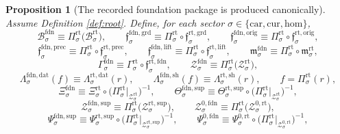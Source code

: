 \documentclass[11pt]{article}
\newcommand{\Car}{\mathrm{car}}
\newcommand{\Cur}{\mathrm{cur}}
\newcommand{\Hom}{\mathrm{hom}}
\newcommand{\FoundBody}[1]{\mathcal B_{#1}^{\mathrm{fdn}}}
\newcommand{\FoundGroundMin}[1]{\mathfrak f_{#1}^{\mathrm{fdn,grd}}}
\newcommand{\FoundOrigMin}[1]{\mathfrak f_{#1}^{\mathrm{fdn,orig}}}
\newcommand{\FoundPrecMin}[1]{\mathfrak f_{#1}^{\mathrm{fdn,prec}}}
\newcommand{\FoundLiftMin}[1]{\mathfrak f_{#1}^{\mathrm{fdn,lift}}}
\newcommand{\FoundSubMin}[1]{\mathfrak m_{#1}^{\mathrm{fdn}}}
\newcommand{\FoundSection}[1]{\Gamma_{#1}^{\mathrm{fdn}}}
\newcommand{\FoundData}[1]{\Lambda_{#1}^{\mathrm{fdn,dat}}}
\newcommand{\FoundShellMap}[1]{\Lambda_{#1}^{\mathrm{fdn,sh}}}
\newcommand{\FoundShellSet}[1]{\mathcal Z_{#1}^{\mathrm{fdn}}}
\newcommand{\FoundChart}[1]{\Xi_{#1}^{\mathrm{fdn}}}
\newcommand{\FoundSupport}[1]{\Theta_{#1}^{\mathrm{fdn,sup}}}
\newcommand{\FoundSupportShell}[1]{\mathcal Z_{#1}^{\mathrm{fdn,sup}}}
\newcommand{\FoundZeroCore}[1]{\mathcal Z_{#1}^{0,\mathrm{fdn}}}
\newcommand{\FoundEqChart}[1]{\Psi_{#1}^{\mathrm{fdn,sup}}}
\newcommand{\FoundZeroChart}[1]{\Psi_{#1}^{0,\mathrm{fdn}}}
\newcommand{\RootBody}[1]{\mathcal B_{#1}^{\mathrm{rt}}}
\newcommand{\RootProj}[1]{\Pi_{#1}^{\mathrm{rt}}}
\newcommand{\RootFoundMin}[1]{\mathfrak f_{#1}^{\mathrm{rt,fdn}}}
\newcommand{\RootGroundMin}[1]{\mathfrak f_{#1}^{\mathrm{rt,grd}}}
\newcommand{\RootOrigMin}[1]{\mathfrak f_{#1}^{\mathrm{rt,orig}}}
\newcommand{\RootPrecMin}[1]{\mathfrak f_{#1}^{\mathrm{rt,prec}}}
\newcommand{\RootLiftMin}[1]{\mathfrak f_{#1}^{\mathrm{rt,lift}}}
\newcommand{\RootSubMin}[1]{\mathfrak m_{#1}^{\mathrm{rt}}}
\newcommand{\RootSection}[1]{\Gamma_{#1}^{\mathrm{rt}}}
\newcommand{\RootData}[1]{\Lambda_{#1}^{\mathrm{rt,dat}}}
\newcommand{\RootShellMap}[1]{\Lambda_{#1}^{\mathrm{rt,sh}}}
\newcommand{\RootShellSet}[1]{\mathcal Z_{#1}^{\mathrm{rt}}}
\newcommand{\RootChart}[1]{\Xi_{#1}^{\mathrm{rt}}}
\newcommand{\RootSupport}[1]{\Theta_{#1}^{\mathrm{rt,sup}}}
\newcommand{\RootSupportShell}[1]{\mathcal Z_{#1}^{\mathrm{rt,sup}}}
\newcommand{\RootZeroCore}[1]{\mathcal Z_{#1}^{0,\mathrm{rt}}}
\newcommand{\RootEqChart}[1]{\Psi_{#1}^{\mathrm{rt,sup}}}
\newcommand{\RootZeroChart}[1]{\Psi_{#1}^{0,\mathrm{rt}}}
\newtheorem{proposition}{Proposition}
\begin{document}
\begin{proposition}[The recorded foundation package is produced canonically]
\label{prop:foundation}
Assume Definition \ref{def:root}. Define, for each sector \(\sigma\in\{\Car,\Cur,\Hom\}\),
\begin{equation}
\FoundBody{\sigma}
\equiv
\RootProj{\sigma}\bigl(\RootBody{\sigma}\bigr),
\qquad
\FoundGroundMin{\sigma}
\equiv
\RootProj{\sigma}\circ\RootGroundMin{\sigma},
\qquad
\FoundOrigMin{\sigma}
\equiv
\RootProj{\sigma}\circ\RootOrigMin{\sigma},
\label{eq:inducedfoundmin1}
\end{equation}
\begin{equation}
\FoundPrecMin{\sigma}
\equiv
\RootProj{\sigma}\circ\RootPrecMin{\sigma},
\qquad
\FoundLiftMin{\sigma}
\equiv
\RootProj{\sigma}\circ\RootLiftMin{\sigma},
\qquad
\FoundSubMin{\sigma}
\equiv
\RootProj{\sigma}\circ\RootSubMin{\sigma},
\label{eq:inducedfoundmin2}
\end{equation}
\begin{equation}
\FoundSection{\sigma}
\equiv
\RootSection{\sigma}\circ\RootFoundMin{\sigma},
\qquad
\FoundShellSet{\sigma}
\equiv
\RootProj{\sigma}\bigl(\RootShellSet{\sigma}\bigr),
\label{eq:inducedfoundshell}
\end{equation}
\begin{equation}
\FoundData{\sigma}(f)
\equiv
\RootData{\sigma}(r),
\qquad
\FoundShellMap{\sigma}(f)
\equiv
\RootShellMap{\sigma}(r),
\qquad
f=\RootProj{\sigma}(r),
\label{eq:inducedfoundreadouts}
\end{equation}
\begin{equation}
\FoundChart{\sigma}
\equiv
\RootChart{\sigma}\circ
\bigl(\RootProj{\sigma}\big|_{\RootShellSet{\sigma}}\bigr)^{-1},
\qquad
\FoundSupport{\sigma}
\equiv
\RootSupport{\sigma}\circ
\bigl(\RootProj{\sigma}\big|_{\RootShellSet{\sigma}}\bigr)^{-1},
\label{eq:inducedfoundchart}
\end{equation}
\begin{equation}
\FoundSupportShell{\sigma}
\equiv
\RootProj{\sigma}\bigl(\RootSupportShell{\sigma}\bigr),
\qquad
\FoundZeroCore{\sigma}
\equiv
\RootProj{\sigma}\bigl(\RootZeroCore{\sigma}\bigr),
\label{eq:inducedfoundsupport}
\end{equation}
\begin{equation}
\FoundEqChart{\sigma}
\equiv
\RootEqChart{\sigma}\circ
\bigl(\RootProj{\sigma}\big|_{\RootSupportShell{\sigma}}\bigr)^{-1},
\qquad
\FoundZeroChart{\sigma}
\equiv
\RootZeroChart{\sigma}\circ
\bigl(\RootProj{\sigma}\big|_{\RootZeroCore{\sigma}}\bigr)^{-1},
\label{eq:inducedfoundeqcharts}

\end{equation}
\end{proposition}
\end{document}
